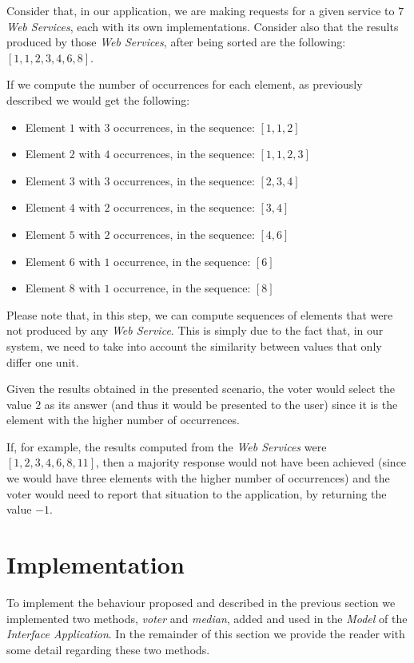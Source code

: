 Consider that, in our application, we are making requests for a given service to $7$ \emph{Web Services}, each with its own implementations. Consider also that the results produced by those \emph{Web Services}, after being sorted are the following: $[1,1,2,3,4,6,8]$.

If we compute the number of occurrences for each element, as previously described we would get the following:

\begin{itemize}
\item Element $1$ with $3$ occurrences, in the sequence: $[1,1,2]$
\item Element $2$ with $4$ occurrences, in the sequence: $[1,1,2,3]$
\item Element $3$ with $3$ occurrences, in the sequence: $[2,3,4]$
\item Element $4$ with $2$ occurrences, in the sequence: $[3,4]$
\item Element $5$ with $2$ occurrences, in the sequence: $[4,6]$
\item Element $6$ with $1$ occurrence, in the sequence: $[6]$
\item Element $8$ with $1$ occurrence, in the sequence: $[8]$
\end{itemize}

Please note that, in this step, we can compute sequences of elements that were not produced by any \emph{Web Service}. This is simply due to the fact that, in our system, we need to take into account the similarity between values that only differ one unit.

Given the results obtained in the presented scenario, the voter would select the value $2$ as its answer (and thus it would be presented to the user) since it is the element with the higher number of occurrences.

If, for example, the results computed from the \emph{Web Services} were  $[1,2,3,4,6,8,11]$, then a majority response would not have been achieved (since we would have three elements with the higher number of occurrences) and the voter would need to report that situation to the application, by returning the value $-1$.

\section{Implementation}

    To implement the behaviour proposed and described in the previous section we implemented two methods, \emph{voter} and \emph{median}, added and used in the \emph{Model} of the \emph{Interface Application}. In the remainder of this section we provide the reader with some detail regarding these two methods.
    
